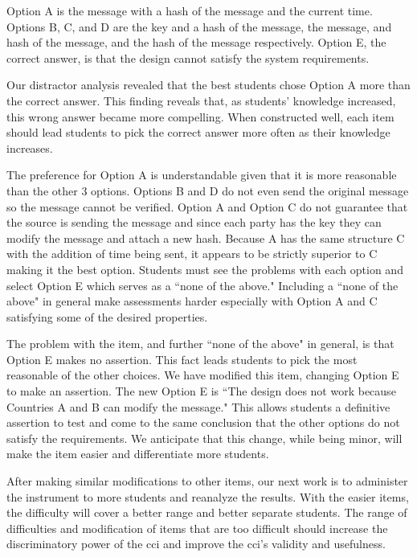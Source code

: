 Option A is the message with a hash of the message and the current time. Options B, C, and D are the key and a hash of the message, the message, and hash of the message, and the hash of the message respectively. Option E, the correct answer, is that the design cannot satisfy the system requirements. 

Our distractor analysis revealed that the best students chose Option A more than the correct answer. This finding reveals that, as students' knowledge increased, this wrong answer became more compelling. When constructed well, each item should lead students to pick the correct answer more often as their knowledge increases.

The preference for Option A is understandable given that it is more reasonable than the other 3 options. Options B and D do not even send the original message so the message cannot be verified. Option A and Option C do not guarantee that the source is sending the message and since each party has the key they can modify the message and attach a new hash. Because A has the same structure C with the addition of time being sent, it appears to be strictly superior to C making it the best option. Students must see the problems with each option and select Option E which serves as a ``none of the above." Including a ``none of the above" in general make assessments harder \cite{none_of_above} especially with Option A and C satisfying some of the desired properties. 

The problem with the item, and further ``none of the above" in general, is that Option E makes no assertion. This fact leads students to pick the most reasonable of the other choices. We have modified this item, changing Option E to make an assertion. The new Option E is ``The design does not work because Countries A and B can modify the message." This allows students a definitive assertion to test and come to the same conclusion that the other options do not satisfy the requirements. We anticipate that this change, while being minor, will make the item easier and differentiate more students.

After making similar modifications to other items, our next work is to administer the instrument to more students and reanalyze the results. With the easier items, the difficulty will cover a better range and better separate students. The range of difficulties and modification of items that are too difficult should increase the discriminatory power of the \gls{cci} and improve the \gls{cci}'s validity and usefulness.
